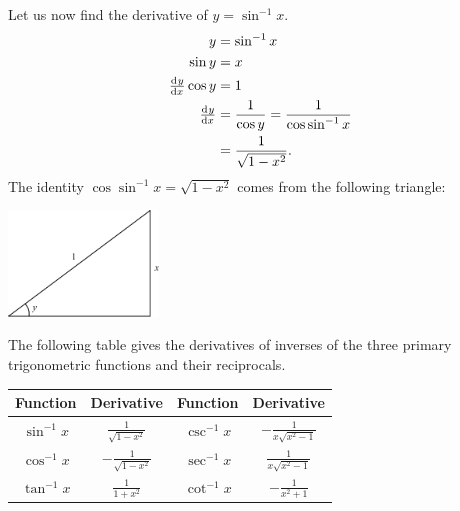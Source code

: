 Let us now find the derivative of $ y = \sin^{-1} x $.
\begin{align*}
  y &= \sin^{-1} x\\
  \sin y &= x\\
  \od{y}{x} \cos y &= 1\\
  \od{y}{x} &= \frac{1}{\cos y} = \frac{1}{\cos \sin^{-1} x}\\
            &= \frac{1}{\sqrt{1 - x^2}}.
\end{align*}
The identity $ \cos\sin^{-1} x = \sqrt{1 - x^2} $ comes from the following triangle:
\begin{center}
  \includegraphics[width=0.3\textwidth]{antitriangle}
\end{center}

\begin{thm}
  The following table gives the derivatives of inverses of the three primary trigonometric functions and
  their reciprocals.
  \begin{center}
  \begin{tabular}{|c|c|c|c|}\hline
    \textbf{Function} & \textbf{Derivative} &
    \textbf{Function} & \textbf{Derivative}\\\hline
    $ \sin^{-1} x $ & $ \frac{1}{\sqrt{1 - x^2}} $ &
    $ \csc^{-1} x $ & $ -\frac{1}{x\sqrt{x^2 - 1}} $ \\\hline
    $ \cos^{-1} x $ & $ -\frac{1}{\sqrt{1 - x^2}} $ &
    $ \sec^{-1} x $ & $ \frac{1}{x\sqrt{x^2 - 1}} $\\\hline
    $ \tan^{-1} x $ & $ \frac{1}{1+x^2} $ &
    $ \cot^{-1} x $ & $ -\frac{1}{x^2 + 1}$\\\hline
  \end{tabular}
  \end{center}
\end{thm}


\clearpage
